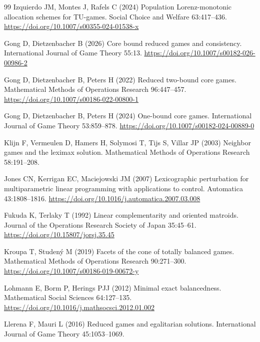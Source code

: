 \documentclass[11pt]{article}
\begin{document}
{\begin{thebibliography}{99}
Izquierdo JM, Montes J, Rafels C (2024) Population Lorenz-monotonic
allocation schemes for TU-games. Social Choice and Welfare 63:417--436.
\url{https://doi.org/10.1007/s00355-024-01538-x}

Gong D, Dietzenbacher B (2026) Core bound reduced games and consistency.
International Journal of Game Theory 55:13.
\url{https://doi.org/10.1007/s00182-026-00986-2}

Gong D, Dietzenbacher B, Peters H (2022) Reduced two-bound core games.
Mathematical Methods of Operations Research 96:447--457.
\url{https://doi.org/10.1007/s00186-022-00800-1}

Gong D, Dietzenbacher B, Peters H (2024) One-bound core games.
International Journal of Game Theory 53:859--878.
\url{https://doi.org/10.1007/s00182-024-00889-0}

Klijn F, Vermeulen D, Hamers H, Solymosi T, Tijs S, Villar JP (2003)
Neighbor games and the leximax solution. Mathematical Methods of Operations
Research 58:191--208.

Jones CN, Kerrigan EC, Maciejowski JM (2007) Lexicographic perturbation for
multiparametric linear programming with applications to control.
Automatica 43:1808--1816.
\url{https://doi.org/10.1016/j.automatica.2007.03.008}

Fukuda K, Terlaky T (1992) Linear complementarity and oriented matroids.
Journal of the Operations Research Society of Japan 35:45--61.
\url{https://doi.org/10.15807/jorsj.35.45}

Kroupa T, Studen\'y M (2019) Facets of the cone of totally balanced games.
Mathematical Methods of Operations Research 90:271--300.
\url{https://doi.org/10.1007/s00186-019-00672-y}

Lohmann E, Borm P, Herings PJJ (2012) Minimal exact balancedness.
Mathematical Social Sciences 64:127--135.
\url{https://doi.org/10.1016/j.mathsocsci.2012.01.002}

Llerena F, Mauri L (2016) Reduced games and egalitarian solutions.
International Journal of Game Theory 45:1053--1069.


\end{thebibliography}}
\end{document}
